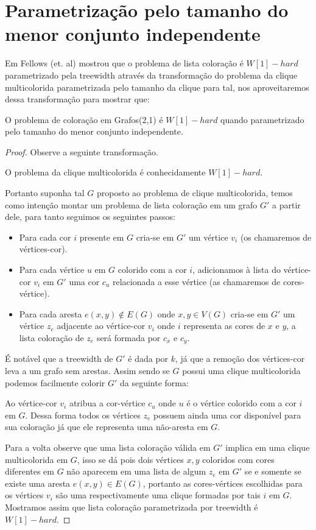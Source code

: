 \section{Parametrização pelo tamanho do menor conjunto independente}
Em \cite{fellows07} Fellows (et. al) mostrou que o problema de lista coloração é $W[1]-hard$ parametrizado pela treewidth através da transformação do problema da clique multicolorida parametrizada pelo tamanho da clique para tal, nos aproveitaremos dessa transformação para mostrar que:
\begin{teorema}
	O problema de coloração em Grafos(2,1) é $W[1]-hard$ quando parametrizado pelo tamanho do menor conjunto independente.
\end{teorema}
\begin{proof}
	Observe a seguinte transformação.
	
	O problema da clique multicolorida é conhecidamente $W[1]-hard$.
	
	Portanto suponha tal $G$ proposto ao problema de clique multicolorida, temos como intenção montar um problema de lista coloração em um grafo $G'$ a partir dele, para tanto seguimos os seguintes passos:
	\begin{itemize}
		\item Para cada cor $i$ presente em $G$ cria-se em $G'$ um vértice $v_i$ (os chamaremos de vértices-cor).
		\item Para cada vértice $u$ em $G$ colorido com a cor $i$, adicionamos à lista do vértice-cor $v_i$ em $G'$ uma cor $c_u$ relacionada a esse vértice (as chamaremos de cores-vértice).
		\item Para cada aresta $e(x,y) \notin E(G)$ onde $x,y \in V(G)$ cria-se em $G'$ um vértice $z_e$ adjacente ao vértice-cor $v_i$ onde $i$ representa as cores de $x$ e $y$, a lista coloração de $z_e$ será formada por $c_x$ e $c_y$.
	\end{itemize}
	É notável que a treewidth de $G'$ é dada por $k$, já que a remoção dos vértices-cor leva a um grafo sem arestas. Assim sendo se $G$ possui uma clique multicolorida podemos facilmente colorir $G'$ da seguinte forma:
	
	Ao vértice-cor $v_i$ atribua a cor-vértice $c_u$ onde $u$ é o vértice colorido com a cor $i$ em $G$. Dessa forma todos os vértices $z_e$ possuem ainda uma cor disponível para sua coloração já que ele representa uma não-aresta em $G$. 
	
	Para a volta observe que uma lista coloração válida em $G'$ implica em uma clique multicolorida em $G$, isso se dá pois dois vértices $x,y$ coloridos com cores diferentes em $G$ não aparecem em uma lista de algum $z_e$ em $G'$ se e somente se existe uma aresta $e(x,y) \in E(G)$, portanto as cores-vértices escolhidas para os vértices $v_i$ são uma respectivamente uma clique formadas por tais $i$ em $G$. Mostramos assim que lista coloração parametrizada por treewidth é $W[1]-hard$.
	

\end{proof}
